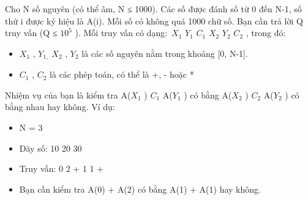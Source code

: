 Cho N số nguyên (có thể âm, N ≤ 1000). Các số được đánh số từ 0 đến N-1, số thứ i được ký hiệu là A(i). Mỗi số có không quá 1000 chữ số. Bạn cần trả lời Q truy vấn (Q ≤ $10^{5}$   ). Mỗi truy vấn có dạng: $X_{1}$   $Y_{1}$   $C_{1}$   $X_{2}$   $Y_{2}$   $C_{2}$   , trong đó:  
\begin{itemize}
	\item     $X_{1}$    , $Y_{1}$$_     ,    $    $X_{2}$    , $Y_{2}$    là các số nguyên nằm trong khoảng [0, N-1].   
	\item     $C_{1}$    , $C_{2}$    là các phép toán, có thể là +, - hoặc *   
\end{itemize}

   Nhiệm vụ của bạn là kiểm tra A($X_{1}$   ) $C_{1}$   A($Y_{1}$   ) có bằng A($X_{2}$   ) $C_{2}$   A($Y_{2}$   ) có bằng nhau hay không. Ví dụ:  
\begin{itemize}
	\item     N = 3   
	\item     Dãy số: 10 20 30   
	\item     Truy vấn: 0 2 + 1 1 +   
	\item     Bạn cần kiểm tra A(0) + A(2) có bằng A(1) + A(1) hay không.   
\end{itemize}